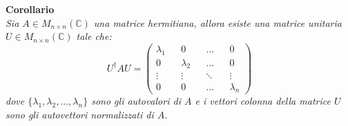 \documentclass{article}
\begin{document}
\Large \textbf{Corollario} \normalsize\vspace{.2cm}\\
\emph{Sia $A\in M_{n\times n}(\mathbb{C})$ una matrice hermitiana, allora esiste una matrice unitaria $U\in M_{n\times n}(\mathbb{C})$ tale che:}
\begin{equation*}
    U^{\dagger}AU=\begin{pmatrix}
        \lambda_1 && 0 && ... && 0\\
        0&&\lambda_2&&... && 0\\
        \vdots &&\vdots&&\ddots&&\vdots\\
        0&&0&&\dots&&\lambda_n
    \end{pmatrix}
\end{equation*}
\emph{dove $\{\lambda_1,\lambda_2,...,\lambda_n\}$ sono gli autovalori di $A$ e i vettori colonna della matrice $U$ sono gli autovettori normalizzati di $A$.} \\
\end{document}
